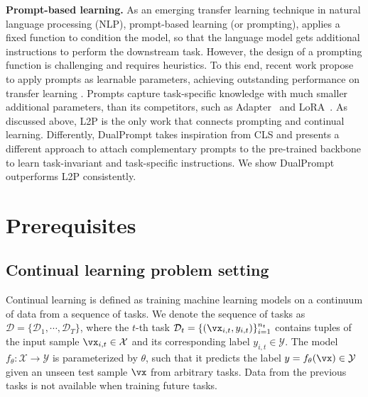 \documentclass[runningheads]{llncs}
\newcommand{\zifeng}[1]{\textcolor{red}{Zifeng: #1}}
\newcommand{\zizhaoz}[1]{\textcolor{green}{Zizhao: #1}}
\newcommand{\method}{DualPrompt\xspace}
\newcommand{\combiner}{PAF\xspace}
\begin{document}
\noindent
\textbf{Prompt-based learning.}
As an emerging transfer learning technique in natural language processing (NLP), prompt-based learning (or prompting), applies a fixed function to condition the model, so that the language model gets additional instructions to perform the downstream task. However, the design of a prompting function is challenging and requires heuristics. To this end, recent work propose to apply prompts as learnable parameters, achieving outstanding performance on transfer learning \cite{lester2021power,li2021prefix}. Prompts capture task-specific knowledge with much smaller additional parameters, than its competitors, such as Adapter~\cite{wang2020k,pfeiffer2020adapterfusion} and LoRA~\cite{hu2021lora}. As discussed above, L2P \cite{wang2021learning} is the only work that connects prompting and continual learning. Differently, \method takes inspiration from CLS and presents a different approach to attach complementary prompts to the pre-trained backbone to learn task-invariant and task-specific instructions. We show \method outperforms L2P consistently.

\section{Prerequisites}
\subsection{Continual learning problem setting}
Continual learning is defined as training machine learning models on a continuum of data from a sequence of tasks. We denote the sequence of tasks as $\mathcal{D} = \{\mathcal{D}_1, \cdots, \mathcal{D}_T\}$, where the $t$-th task $\mathcal{D}_t=\{(\vx_{i, t}, y_{i, t})\}_{i=1}^{n_t}$ contains tuples of the input sample $\vx_{i, t} \in \mathcal{X}$ and its corresponding label $y_{i, t} \in \mathcal{Y}$. 
The model $f_\theta: \mathcal{X} \to \mathcal{Y}$ is parameterized by $\theta$, such that it predicts the label $y = f_\theta(\vx) \in \mathcal{Y}$ given an unseen test sample $\vx$ from arbitrary tasks. 
Data from the previous tasks is not available when training future tasks. 
\end{document}
